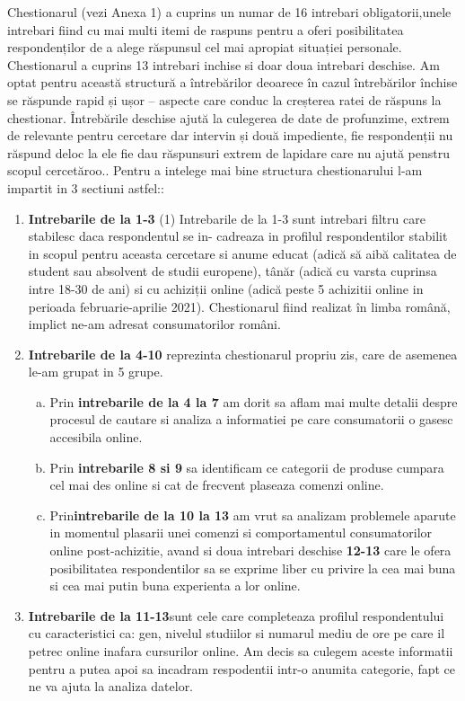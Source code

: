 \documentclass[a4paper, 12pt]{article}
\begin{document}
		\quad Chestionarul (vezi Anexa 1) a cuprins un numar de 16 intrebari obligatorii,unele intrebari fiind cu mai multi itemi de raspuns pentru a oferi posibilitatea respondenților de a alege răspunsul cel mai apropiat situației personale. Chestionarul a cuprins 13 intrebari inchise si doar doua intrebari deschise. Am optat pentru această structură a întrebărilor deoarece în cazul întrebărilor închise se răspunde rapid și ușor – aspecte care conduc la creșterea ratei de răspuns la chestionar. Întrebările deschise  ajută la culegerea de date de profunzime, extrem de relevante pentru cercetare dar intervin și două impediente, fie respondenții nu răspund deloc la ele fie dau răspunsuri extrem de lapidare care nu ajută penstru scopul cercetăroo.. Pentru a intelege mai bine structura chestionarului l-am impartit in 3 sectiuni astfel::
		\begin{enumerate}[(1)]
			\item\textbf{Intrebarile de la 1-3} (1)	Intrebarile de la 1-3 sunt intrebari filtru care stabilesc daca respondentul se in- cadreaza in profilul respondentilor stabilit in scopul pentru aceasta cercetare si anume educat (adică să aibă calitatea de student sau absolvent de studii europene), tânăr (adică cu varsta cuprinsa intre 18-30 de ani) si cu achiziții online (adică peste 5 achizitii online in perioada februarie-aprilie 2021). Chestionarul fiind realizat în limba română, implict ne-am adresat consumatorilor români. 
			\item\textbf{Intrebarile de la 4-10} reprezinta chestionarul propriu zis, care de asemenea le-am grupat in 5 grupe.
		\begin{enumerate}[(a)]
			\item Prin \textbf{intrebarile de la 4 la 7} am dorit sa aflam mai multe detalii despre procesul de cautare si analiza a informatiei pe care consumatorii o gasesc accesibila online.
			\item Prin \textbf{intrebarile 8 si 9} sa identificam ce categorii de produse cumpara cel mai des online si cat de frecvent plaseaza comenzi online.
			\item Prin\textbf{intrebarile de la 10 la 13} am vrut sa analizam problemele aparute in momentul plasarii unei comenzi si comportamentul consumatorilor online post-achizitie, avand si doua intrebari deschise \textbf {12-13} care le ofera posibilitatea respondentilor sa se exprime liber cu privire la cea mai buna si cea mai putin buna experienta a lor online.
		\end{enumerate}
		\item\textbf{Intrebarile de la 11-13}sunt cele care completeaza profilul respondentului cu caracteristici ca: gen, nivelul studiilor si numarul mediu de ore pe care il petrec online inafara cursurilor online. Am decis sa culegem aceste informatii pentru a putea apoi sa incadram respodentii intr-o anumita categorie, fapt ce ne va ajuta la analiza datelor.
		\end{enumerate}
	
\end{document}
